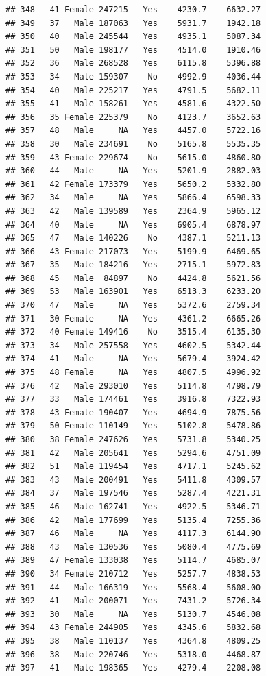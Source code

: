 \documentclass[12pt,]{krantz}
\theoremstyle{definition}
\theoremstyle{definition}
\theoremstyle{remark}
\begin{document}
\begin{verbatim}
## 348   41 Female 247215   Yes    4230.7    6632.27
## 349   37   Male 187063   Yes    5931.7    1942.18
## 350   40   Male 245544   Yes    4935.1    5087.34
## 351   50   Male 198177   Yes    4514.0    1910.46
## 352   36   Male 268528   Yes    6115.8    5396.88
## 353   34   Male 159307    No    4992.9    4036.44
## 354   40   Male 225217   Yes    4791.5    5682.11
## 355   41   Male 158261   Yes    4581.6    4322.50
## 356   35 Female 225379    No    4123.7    3652.63
## 357   48   Male     NA   Yes    4457.0    5722.16
## 358   30   Male 234691    No    5165.8    5535.35
## 359   43 Female 229674    No    5615.0    4860.80
## 360   44   Male     NA   Yes    5201.9    2882.03
## 361   42 Female 173379   Yes    5650.2    5332.80
## 362   34   Male     NA   Yes    5866.4    6598.33
## 363   42   Male 139589   Yes    2364.9    5965.12
## 364   40   Male     NA   Yes    6905.4    6878.97
## 365   47   Male 140226    No    4387.1    5211.13
## 366   43 Female 217073   Yes    5199.9    6469.65
## 367   35   Male 184216   Yes    2715.1    5972.83
## 368   45   Male  84897    No    4424.8    5621.56
## 369   53   Male 163901   Yes    6513.3    6233.20
## 370   47   Male     NA   Yes    5372.6    2759.34
## 371   30 Female     NA   Yes    4361.2    6665.26
## 372   40 Female 149416    No    3515.4    6135.30
## 373   34   Male 257558   Yes    4602.5    5342.44
## 374   41   Male     NA   Yes    5679.4    3924.42
## 375   48 Female     NA   Yes    4807.5    4996.92
## 376   42   Male 293010   Yes    5114.8    4798.79
## 377   33   Male 174461   Yes    3916.8    7322.93
## 378   43 Female 190407   Yes    4694.9    7875.56
## 379   50 Female 110149   Yes    5102.8    5478.86
## 380   38 Female 247626   Yes    5731.8    5340.25
## 381   42   Male 205641   Yes    5294.6    4751.09
## 382   51   Male 119454   Yes    4717.1    5245.62
## 383   43   Male 200491   Yes    5411.8    4309.57
## 384   37   Male 197546   Yes    5287.4    4221.31
## 385   46   Male 162741   Yes    4922.5    5346.71
## 386   42   Male 177699   Yes    5135.4    7255.36
## 387   46   Male     NA   Yes    4117.3    6144.90
## 388   43   Male 130536   Yes    5080.4    4775.69
## 389   47 Female 133038   Yes    5114.7    4685.07
## 390   34 Female 210712   Yes    5257.7    4838.53
## 391   44   Male 166319   Yes    5568.4    5608.00
## 392   41   Male 200071   Yes    7431.2    5726.34
## 393   30   Male     NA   Yes    5130.7    4546.08
## 394   43 Female 244905   Yes    4345.6    5832.68
## 395   38   Male 110137   Yes    4364.8    4809.25
## 396   38   Male 220746   Yes    5318.0    4468.87
## 397   41   Male 198365   Yes    4279.4    2208.08

\end{verbatim}
\end{document}
